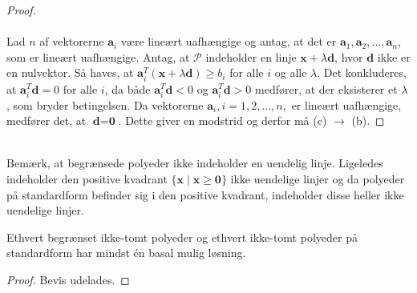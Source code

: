 \begin{proof}
\\\\
%
Lad $n$ af vektorerne $\textbf{a}_i$ være lineært uafhængige og antag, at det er $\textbf{a}_1, \textbf{a}_2, \ldots , \textbf{a}_n$, som er lineært uafhængige.
Antag, at $\mathcal{P}$ indeholder en linje $\textbf{x} + \lambda \textbf{d}$, hvor $\textbf{d}$ ikke er en nulvektor.
Så haves, at $\textbf{a}_i^T (\textbf{x} + \lambda \textbf{d}) \geq b_i$ for alle $i$ og alle $\lambda$.
Det konkluderes, at $\textbf{a}_i^T \textbf{d} = 0$ for alle $i$, da både  $\textbf{a}_i^T \textbf{d} < 0$ og  $\textbf{a}_i^T \textbf{d} > 0$ medfører, at der eksisterer et $\lambda$, som bryder betingelsen.
Da vektorerne $\textbf{a}_i, i = 1, 2, \ldots, n,$ er lineært uafhængige, medfører det, at $\textbf{d}=\textbf{0}$.
Dette giver en modstrid og derfor må (c) $\rightarrow$ (b).
\end{proof}\\
%
Bemærk, at begrænsede polyeder ikke indeholder en uendelig linje.
Ligeledes indeholder den positive kvadrant $\{ \textbf{x} \mid \textbf{x} \geq \textbf{0}\}$ ikke uendelige linjer og da polyeder på standardform befinder sig i den positive kvadrant, indeholder disse heller ikke uendelige linjer.
%
\begin{kor}{}{}
Ethvert begrænset ikke-tomt polyeder og ethvert ikke-tomt polyeder på standardform har mindst én basal mulig løsning.
\end{kor}
%
\begin{proof}
Bevis udelades.
\end{proof}